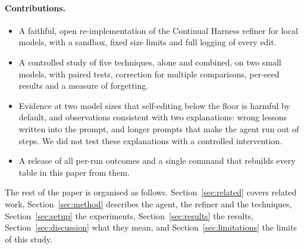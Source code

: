 \paragraph{Contributions.}
\begin{itemize}
  \item A faithful, open re-implementation of the Continual Harness refiner for local models, with
        a sandbox, fixed size limits and full logging of every edit.
  \item A controlled study of five techniques, alone and combined, on two small models, with paired
        tests, correction for multiple comparisons, per-seed results and a measure of forgetting.
  \item Evidence at two model sizes that self-editing below the floor is harmful by default, and
        observations consistent with two explanations: wrong lessons written into the prompt, and
        longer prompts that make the agent run out of steps. We did not test these explanations
        with a controlled intervention.
  \item A release of all per-run outcomes and a single command that rebuilds every table in this
        paper from them.
\end{itemize}

The rest of the paper is organised as follows. Section~\ref{sec:related} covers related work,
Section~\ref{sec:method} describes the agent, the refiner and the techniques,
Section~\ref{sec:setup} the experiments, Section~\ref{sec:results} the results,
Section~\ref{sec:discussion} what they mean, and Section~\ref{sec:limitations} the limits of
this study.
